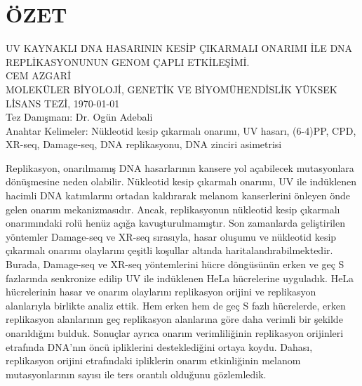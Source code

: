\chapter*{\vspace{-4\baselineskip} \bf ÖZET} 
\begin{otherlanguage}{turkish}
\begin{center}
\MakeUppercase{UV KAYNAKLI DNA HASARININ KESİP ÇIKARMALI ONARIMI İLE DNA REPLİKASYONUNUN GENOM ÇAPLI ETKİLEŞİMİ.} \\[3\baselineskip]
\MakeUppercase{CEM AZGARİ} \\[\baselineskip]
MOLEKÜLER BİYOLOJİ, GENETİK VE BİYOMÜHENDİSLİK YÜKSEK LİSANS TEZİ, \Cemdateformat\today \\[\baselineskip]
Tez Danışmanı: Dr. Ogün Adebali \\[2\baselineskip]
Anahtar Kelimeler: Nükleotid kesip çıkarmalı onarımı, UV hasarı, (6-4)PP, CPD, XR-seq, Damage-seq, DNA replikasyonu, DNA zinciri asimetrisi \\[2\baselineskip]
\end{center}

\singlespacing
Replikasyon, onarılmamış DNA hasarlarının kansere yol açabilecek mutasyonlara dönüşmesine neden olabilir. Nükleotid kesip çıkarmalı onarımı, UV ile indüklenen hacimli DNA katımlarını ortadan kaldırarak melanom kanserlerini önleyen önde gelen onarım mekanizmasıdır. Ancak, replikasyonun nükleotid kesip çıkarmalı onarımındaki rolü henüz açığa kavuşturulmamıştır. Son zamanlarda geliştirilen yöntemler Damage-seq ve XR-seq sırasıyla, hasar oluşumu ve nükleotid kesip çıkarmalı onarımı olaylarını çeşitli koşullar altında haritalandırabilmektedir. Burada, Damage-seq ve XR-seq yöntemlerini hücre döngüsünün erken ve geç S fazlarında senkronize edilip UV ile indüklenen HeLa hücrelerine uyguladık. HeLa hücrelerinin hasar ve onarım olaylarını replikasyon orijini ve replikasyon alanlarıyla birlikte analiz ettik. Hem erken hem de geç S fazlı hücrelerde, erken replikasyon alanlarının geç replikasyon alanlarına göre daha verimli bir şekilde onarıldığını bulduk. Sonuçlar ayrıca onarım verimliliğinin replikasyon orijinleri etrafında DNA'nın öncü ipliklerini desteklediğini ortaya koydu. Dahası, replikasyon orijini etrafındaki ipliklerin onarım etkinliğinin melanom mutasyonlarının sayısı ile ters orantılı olduğunu gözlemledik.

\end{otherlanguage}

\clearpage\pagebreak
\onehalfspacing